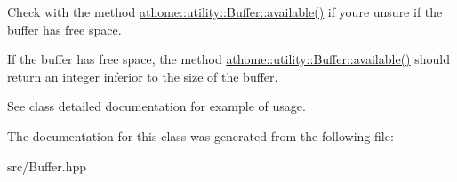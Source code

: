 Check with the method \mbox{\hyperlink{classathome_1_1utility_1_1_buffer_a2c441e74e8e325e8eb6cfb7ffb04b157}{athome\+::utility\+::\+Buffer\+::available()}} if you\textquotesingle{}re unsure if the buffer has free space.

If the buffer has free space, the method \mbox{\hyperlink{classathome_1_1utility_1_1_buffer_a2c441e74e8e325e8eb6cfb7ffb04b157}{athome\+::utility\+::\+Buffer\+::available()}} should return an integer inferior to the size of the buffer.

See class detailed documentation for example of usage. 

The documentation for this class was generated from the following file\+:\begin{DoxyCompactItemize}
\item 
src/Buffer.\+hpp\end{DoxyCompactItemize}
